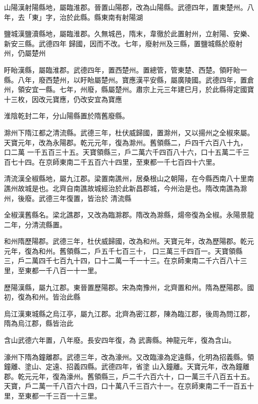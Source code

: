 \begin{pinyinscope}
 山陽漢射陽縣地，屬臨淮郡。晉置山陽郡，改為山陽縣。武德四年，置東楚州。八年，去「東」字，治於此縣。縣東南有射陽湖



 鹽城漢鹽瀆縣地，屬臨淮郡。久無城邑，隋末，韋徹於此置射州，立射陽、安樂、新安三縣。武德四年
 歸國，因而不改。七年，廢射州及三縣，置鹽城縣於廢射州，仍屬楚州



 盱眙漢縣，屬臨淮郡。武德四年，置西楚州。置總管，管東楚、西楚。領盱眙一縣。八年，廢西楚州，以盱眙屬楚州。寶應漢平安縣，屬廣陵國。武德四年，置倉州，領安宜一縣。七年，州廢，縣屬楚州。肅宗上元三年建巳月，於此縣得定國寶十三枚，因改元寶應，仍改安宜為寶應



 淮陰乾封二年，分山陽縣置於隋舊廢縣。



 滁州下隋江都之清流縣。武德三年，杜伏威歸國，置滁州，又以揚州之全椒來屬。天寶元年，改為永陽郡。乾元元年，復為滁州。舊領縣二，戶四千六百八十九，
 口二萬
 一千五百三十五。天寶領縣三，戶二萬六千四百八十六，口十五萬二千三百七十四。在京師東南二千五百六十四里，至東都一千七百四十六里。



 清流漢全椒縣地，屬九江郡。梁置南譙州，居桑根山之朝陽，在今縣西南八十里南譙州故城是也。北齊自南譙故城經治於此新昌郡城，今州治是也。隋改南譙為滁州，後廢。武德三年復置，皆治於
 清流縣



 全椒漢舊縣名。梁北譙郡，又改為臨滁郡。隋改為滁縣，煬帝復為全椒。永陽景龍二年，分清流縣置。



 和州隋歷陽郡。武德三年，杜伏威歸國，改為和州。天寶元年，改為歷陽郡。乾元元年，復為和州。舊領縣二，戶五千七百三十，
 口三萬三千四百一。天寶領縣三，戶二萬四千七百九十四，口十二萬一千一十三。在京師東南二千六百八十三里，至東都一千八百一十一里。



 歷陽漢縣，屬九江郡。東晉置歷陽郡。宋為南豫州，北齊置和州。隋為歷陽郡。國初，復為和州。皆治此縣



 烏江漢東城縣之烏江亭，屬九江郡。北齊為密江郡，陳為臨江郡，後周為問江郡，隋為烏江郡，縣皆治此



 含山武德六年置，八年廢。長安四年復，為
 武壽縣。神龍元年，復為含山。



 濠州下隋為鐘離郡。武德三年，改為濠州。又改臨濠為定遠縣，化明為招義縣。領鐘離、塗山、定遠、招義四縣。武德四年，省塗
 山入鐘離。天寶元年，改為鐘離郡。乾元元年，復為濠州。舊領縣三，戶二千六百六十，口一萬三千八百五十五。天寶，戶二萬一千八百六十四，口十萬八千三百六十一。在京師東南二千一百五十里，至東都一千三百一十三里。




\end{pinyinscope}
